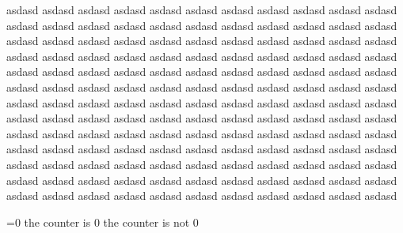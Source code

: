 \documentclass[sin nombre]{srs}
\begin{document}
\begin{preguntitas}
  \preguntita asdasd
  \preguntita asdasd
  \preguntita asdasd
  \preguntita asdasd
  \preguntita asdasd
  \preguntita asdasd
  \preguntita asdasd
  \preguntita asdasd
  \preguntita asdasd
  \preguntita asdasd
  \preguntita asdasd
  \preguntita asdasd
  \preguntita asdasd
  \preguntita asdasd
  \preguntita asdasd
  \preguntita asdasd
  \preguntita asdasd
  \preguntita asdasd
  \preguntita asdasd
  \preguntita asdasd
  \preguntita asdasd
  \preguntita asdasd
  \preguntita asdasd
  \preguntita asdasd
  \preguntita asdasd
  \preguntita asdasd
  \preguntita asdasd
  \preguntita asdasd
  \preguntita asdasd
  \preguntita asdasd
  \preguntita asdasd
  \preguntita asdasd
  \preguntita asdasd
  \preguntita asdasd
  \preguntita asdasd
  \preguntita asdasd
  \preguntita asdasd
  \preguntita asdasd
  \preguntita asdasd
  \preguntita asdasd
  \preguntita asdasd
  \preguntita asdasd
  \preguntita asdasd
  \preguntita asdasd
  \preguntita asdasd
  \preguntita asdasd
  \preguntita asdasd
  \preguntita asdasd
  \preguntita asdasd
  \preguntita asdasd
  \preguntita asdasd
  \preguntita asdasd
  \preguntita asdasd
  \preguntita asdasd
  \preguntita asdasd
  \preguntita asdasd
  \preguntita asdasd
  \preguntita asdasd
  \preguntita asdasd
  \preguntita asdasd
  \preguntita asdasd
  \preguntita asdasd
  \preguntita asdasd
  \preguntita asdasd
  \preguntita asdasd
  \preguntita asdasd
  \preguntita asdasd
  \preguntita asdasd
  \preguntita asdasd
  \preguntita asdasd
  \preguntita asdasd
  \preguntita asdasd
  \preguntita asdasd
  \preguntita asdasd
  \preguntita asdasd
  \preguntita asdasd
  \preguntita asdasd
  \preguntita asdasd
  \preguntita asdasd
  \preguntita asdasd
  \preguntita asdasd
  \preguntita asdasd
  \preguntita asdasd
  \preguntita asdasd
  \preguntita asdasd
  \preguntita asdasd
  \preguntita asdasd
  \preguntita asdasd
  \preguntita asdasd
  \preguntita asdasd
  \preguntita asdasd
  \preguntita asdasd
  \preguntita asdasd
  \preguntita asdasd
  \preguntita asdasd
  \preguntita asdasd
  \preguntita asdasd
  \preguntita asdasd
  \preguntita asdasd
  \preguntita asdasd
  \preguntita asdasd
  \preguntita asdasd
  \preguntita asdasd
  \preguntita asdasd
  \preguntita asdasd
  \preguntita asdasd
  \preguntita asdasd
  \preguntita asdasd
  \preguntita asdasd
  \preguntita asdasd
  \preguntita asdasd
  \preguntita asdasd
  \preguntita asdasd
  \preguntita asdasd
  \preguntita asdasd
  \preguntita asdasd
  \preguntita asdasd
  \preguntita asdasd
  \preguntita asdasd
  \preguntita asdasd
  \preguntita asdasd
  \preguntita asdasd
  \preguntita asdasd
  \preguntita asdasd
  \preguntita asdasd
  \preguntita asdasd
  \preguntita asdasd
  \preguntita asdasd
  \preguntita asdasd
  \preguntita asdasd
  \preguntita asdasd
  \preguntita asdasd
  \preguntita asdasd
  \preguntita asdasd
  \preguntita asdasd
  \preguntita asdasd
  \preguntita asdasd
  \preguntita asdasd
  \preguntita asdasd
  \preguntita asdasd
  \preguntita asdasd
  \preguntita asdasd
  \preguntita asdasd


\end{preguntitas}

\setcounter{testcounter}{3}

\ifnum\value{testcounter}=0
the counter is 0
\else
the counter is not 0
\fi
\end{document}
